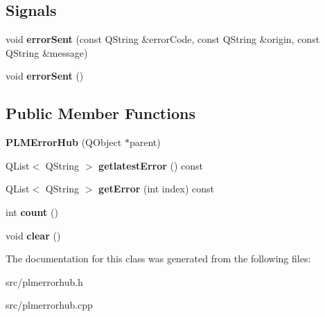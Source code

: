 \subsection*{Signals}
\begin{DoxyCompactItemize}
\item 
void {\bfseries error\+Sent} (const Q\+String \&error\+Code, const Q\+String \&origin, const Q\+String \&message)\hypertarget{class_p_l_m_error_hub_ac6fbc995d2278d6770d1fede0a55c811}{}\label{class_p_l_m_error_hub_ac6fbc995d2278d6770d1fede0a55c811}

\item 
void {\bfseries error\+Sent} ()\hypertarget{class_p_l_m_error_hub_ae88787d18851112cc459cebc3485d8a9}{}\label{class_p_l_m_error_hub_ae88787d18851112cc459cebc3485d8a9}

\end{DoxyCompactItemize}
\subsection*{Public Member Functions}
\begin{DoxyCompactItemize}
\item 
{\bfseries P\+L\+M\+Error\+Hub} (Q\+Object $\ast$parent)\hypertarget{class_p_l_m_error_hub_a52e272cb8c0ae4a1e8c57b34fafb0d85}{}\label{class_p_l_m_error_hub_a52e272cb8c0ae4a1e8c57b34fafb0d85}

\item 
Q\+List$<$ Q\+String $>$ {\bfseries getlatest\+Error} () const \hypertarget{class_p_l_m_error_hub_a12aa63f7e81db43b7ba2644b6611f5e7}{}\label{class_p_l_m_error_hub_a12aa63f7e81db43b7ba2644b6611f5e7}

\item 
Q\+List$<$ Q\+String $>$ {\bfseries get\+Error} (int index) const \hypertarget{class_p_l_m_error_hub_ade5b6fcd2db59f8a515748b9f8fac109}{}\label{class_p_l_m_error_hub_ade5b6fcd2db59f8a515748b9f8fac109}

\item 
int {\bfseries count} ()\hypertarget{class_p_l_m_error_hub_a65a23a53f162183bdb5359069dfdeaa4}{}\label{class_p_l_m_error_hub_a65a23a53f162183bdb5359069dfdeaa4}

\item 
void {\bfseries clear} ()\hypertarget{class_p_l_m_error_hub_a5858e0f97f67f182e76a6b5a76e57444}{}\label{class_p_l_m_error_hub_a5858e0f97f67f182e76a6b5a76e57444}

\end{DoxyCompactItemize}


The documentation for this class was generated from the following files\+:\begin{DoxyCompactItemize}
\item 
src/plmerrorhub.\+h\item 
src/plmerrorhub.\+cpp\end{DoxyCompactItemize}
